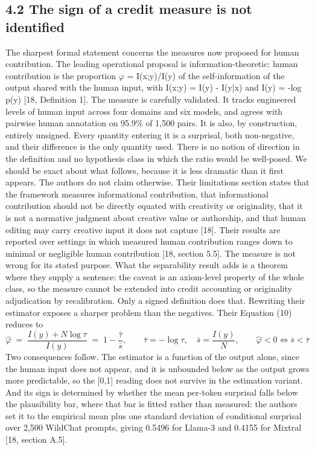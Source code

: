 \documentclass[11pt,a4paper]{article}
\theoremstyle{definition}
\theoremstyle{remark}
\begin{document}
\subsection*{4.2  The sign of a credit measure is not identified}
The sharpest formal statement concerns the measures now proposed for human contribution. The leading operational proposal is information-theoretic: human contribution is the proportion $φ$ = I(x;y)/I(y) of the self-information of the output shared with the human input, with I(x;y) = I(y) - I(y|x) and I(y) = -log p(y) [18, Definition 1]. The measure is carefully validated. It tracks engineered levels of human input across four domains and six models, and agrees with pairwise human annotation on 95.9\% of 1,500 pairs.
It is also, by construction, entirely unsigned. Every quantity entering it is a surprisal, both non-negative, and their difference is the only quantity used. There is no notion of direction in the definition and no hypothesis class in which the ratio would be well-posed.
We should be exact about what follows, because it is less dramatic than it first appears. The authors do not claim otherwise. Their limitations section states that the framework measures informational contribution, that informational contribution should not be directly equated with creativity or originality, that it is not a normative judgment about creative value or authorship, and that human editing may carry creative input it does not capture [18]. Their results are reported over settings in which measured human contribution ranges down to minimal or negligible human contribution [18, section 5.5]. The measure is not wrong for its stated purpose. What the separability result adds is a theorem where they supply a sentence: the caveat is an axiom-level property of the whole class, so the measure cannot be extended into credit accounting or originality adjudication by recalibration. Only a signed definition does that.
Rewriting their estimator exposes a sharper problem than the negatives. Their Equation (10) reduces to
\begin{equation}
\hat{\varphi}\;=\;\frac{I(y)+N\log\tau}{I(y)}\;=\;1-\frac{\bar{\tau}}{\bar{s}},\qquad \bar{\tau}=-\log\tau,\quad \bar{s}=\frac{I(y)}{N},\qquad \hat{\varphi}<0\iff\bar{s}<\bar{\tau}
\tag{12}
\end{equation}
Two consequences follow. The estimator is a function of the output alone, since the human input does not appear, and it is unbounded below as the output grows more predictable, so the [0,1] reading does not survive in the estimation variant. And its sign is determined by whether the mean per-token surprisal falls below the plausibility bar, where that bar is fitted rather than measured: the authors set it to the empirical mean plus one standard deviation of conditional surprisal over 2,500 WildChat prompts, giving 0.5496 for Llama-3 and 0.4155 for Mixtral [18, section A.5].
\end{document}
